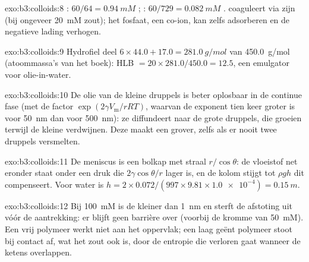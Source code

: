 \begin{solution}{exo:b3:colloids:8}
: $60/64 = \qty{0.94}{mM}$ ; : $60/729 = \qty{0.082}{mM}$ . 
coaguleert via zijn  (bij ongeveer \qty{20}{mM} zout); het fosfaat,
een co-ion, kan zelfs adsorberen en de negatieve lading verhogen.
\end{solution}

\begin{solution}{exo:b3:colloids:9}
Hydrofiel deel $6 \times 44.0 + 17.0 = \qty{281.0}{g/mol}$ van \qty{450.0}{g/mol} (atoommassa's van het boek):
HLB $= 20 \times 281.0/450.0 = 12.5$, een emulgator voor olie-in-water.
\end{solution}

\begin{solution}{exo:b3:colloids:10}
De olie van de kleine druppels is beter oplosbaar in de continue fase (met
de factor $\exp(2\gamma V_{\mathrm m}/rRT)$, waarvan de exponent tien keer groter is voor \qty{50}{nm} dan voor \qty{500}{nm}): ze
diffundeert naar de grote druppels, die groeien terwijl de kleine
verdwijnen. Deze  maakt een  grover, zelfs als er
nooit twee druppels versmelten.
\end{solution}

\begin{solution}{exo:b3:colloids:11}
De meniscus is een bolkap met straal $r/\cos\theta$: de vloeistof net eronder staat onder een
druk die $2\gamma\cos\theta/r$ lager is, en de kolom stijgt tot $\rho gh$ dit compenseert. Voor water is
$h = 2 \times 0.072/(997 \times 9.81 \times \num{1.0e-4}) = \qty{0.15}{m}$.
\end{solution}

\begin{solution}{exo:b3:colloids:12}
Bij \qty{100}{mM} is de  kleiner dan \qty{1}{nm} en sterft de
afstoting uit vóór de
aantrekking: er blijft geen barrière over (voorbij de kromme van \qty{50}{mM}). Een vrij polymeer
werkt niet aan het oppervlak; een laag geënt polymeer stoot bij contact
af, wat het zout ook is, door de entropie die verloren gaat wanneer de
ketens overlappen.
\end{solution}

